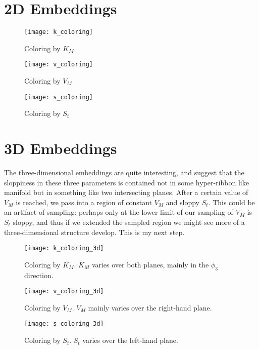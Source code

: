 \documentclass[11pt]{article}
\begin{document}
\section*{2D Embeddings}

\begin{figure}[htbp]
  \centering
  \texttt{[image: k\_coloring]}
  \caption{Coloring by $K_M$}
  \label{fig:K}
\end{figure}

\begin{figure}[htbp]
  \centering
  \texttt{[image: v\_coloring]}
  \caption{Coloring by $V_M$}
  \label{fig:V}
\end{figure}

\begin{figure}[htbp]
  \centering
  \texttt{[image: s\_coloring]}
  \caption{Coloring by $S_t$}
  \label{fig:S}
\end{figure}

\clearpage

\section*{3D Embeddings}

The three-dimensional embeddings are quite interesting, and suggest that the sloppiness in these three parameters is contained not in some hyper-ribbon like manifold but in something like two intersecting planes. After a certain value of $V_M$ is reached, we pass into a region of constant $V_M$ and sloppy $S_t$. This could be an artifact of sampling: perhaps only at the lower limit of our sampling of $V_M$ is $S_t$ sloppy, and thus if we extended the sampled region we might see more of a three-dimensional structure develop. This is my next step.

\begin{figure}[htbp]
  \centering
  \texttt{[image: k\_coloring\_3d]}
  \caption{Coloring by $K_M$. $K_M$ varies over both planes, mainly in the $\phi_3$ direction.}
  \label{fig:K}
\end{figure}

\begin{figure}[htbp]
  \centering
  \texttt{[image: v\_coloring\_3d]}
  \caption{Coloring by $V_M$. $V_M$ mainly varies over the right-hand plane.}
  \label{fig:V}
\end{figure}

\begin{figure}[htbp]
  \centering
  \texttt{[image: s\_coloring\_3d]}
  \caption{Coloring by $S_t$. $S_t$ varies over the left-hand plane.}
  \label{fig:S}
\end{figure}

% 
% 
\end{document}
